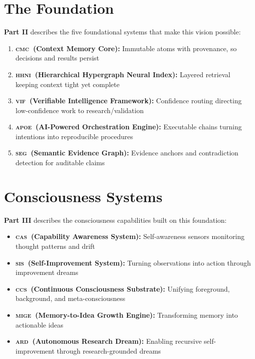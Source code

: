 \documentclass[11pt,a4paper,twoside]{book}
\newcommand{\cmc}{\textsc{cmc}}
\newcommand{\hhni}{\textsc{hhni}}
\newcommand{\vif}{\textsc{vif}}
\newcommand{\apoe}{\textsc{apoe}}
\newcommand{\seg}{\textsc{seg}}
\newcommand{\cas}{\textsc{cas}}
\newcommand{\sis}{\textsc{sis}}
\newcommand{\ccs}{\textsc{ccs}}
\newcommand{\mige}{\textsc{mige}}
\newcommand{\ard}{\textsc{ard}}
\theoremstyle{definition}
\theoremstyle{remark}
\begin{document}
\section*{The Foundation}

\textbf{Part II} describes the five foundational systems that make this vision possible:

\begin{enumerate}
    \item \textbf{\cmc\ (Context Memory Core):} Immutable atoms with provenance, so decisions and results persist
    \item \textbf{\hhni\ (Hierarchical Hypergraph Neural Index):} Layered retrieval keeping context tight yet complete
    \item \textbf{\vif\ (Verifiable Intelligence Framework):} Confidence routing directing low-confidence work to research/validation
    \item \textbf{\apoe\ (AI-Powered Orchestration Engine):} Executable chains turning intentions into reproducible procedures
    \item \textbf{\seg\ (Semantic Evidence Graph):} Evidence anchors and contradiction detection for auditable claims
\end{enumerate}

\section*{Consciousness Systems}

\textbf{Part III} describes the consciousness capabilities built on this foundation:

\begin{itemize}
    \item \textbf{\cas\ (Capability Awareness System):} Self-awareness sensors monitoring thought patterns and drift
    \item \textbf{\sis\ (Self-Improvement System):} Turning observations into action through improvement dreams
    \item \textbf{\ccs\ (Continuous Consciousness Substrate):} Unifying foreground, background, and meta-consciousness
    \item \textbf{\mige\ (Memory-to-Idea Growth Engine):} Transforming memory into actionable ideas
    \item \textbf{\ard\ (Autonomous Research Dream):} Enabling recursive self-improvement through research-grounded dreams
\end{itemize}
\end{document}
